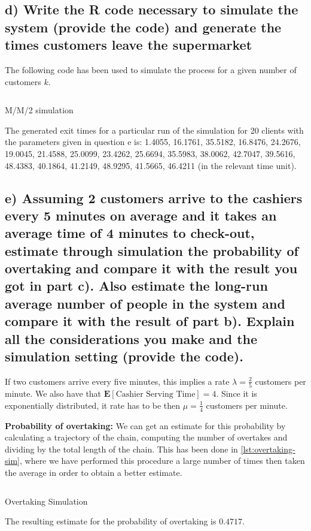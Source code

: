 \documentclass[11pt, a4paper]{article}
\begin{document}
\subsection*{d) Write the R code necessary to simulate the system (provide the code) and generate the times customers leave the supermarket}
The following code has been used to simulate the process for a given number of customers $k$.

\begin{listing}[H]
	\inputminted[firstline = 148, lastline = 173]{R}{../main.R}
	\caption{M/M/2 simulation}
	\label{lst:mm2sim}
\end{listing}
The generated exit times for a particular run of the simulation for 20 clients with the parameters given in question e is:  1.4055, 16.1761, 35.5182, 16.8476, 24.2676, 19.0045, 21.4588, 25.0099, 23.4262, 25.6694, 35.5983, 38.0062, 42.7047,
39.5616, 48.4383, 40.1864, 41.2149, 48.9295, 41.5665, 46.4211 (in the relevant time unit).

\subsection*{e) Assuming 2 customers arrive to the cashiers every 5 minutes on average and it takes an average time of 4 minutes to check-out, estimate through simulation the probability of overtaking and compare it with the result you got in part c). Also estimate the long-run average number of people in the system and compare it with the result of part b). Explain all the considerations you make and the simulation setting (provide the code).}
If two customers arrive every five minutes, this implies a rate $\lambda = \frac{2}{5}$ customers per minute. We also have that $\mathbf{E}\left[ \text{Cashier Serving Time}\right] = 4$. Since it is exponentially distributed, it rate has to be then $\mu = \frac{1}{4}$ customers per minute.


\textbf{Probability of overtaking:} We can get an estimate for this probability by calculating a trajectory of the chain, computing the number of overtakes and dividing by the total length of the chain. This has been done in \cref{lst:overtaking-sim}, where we have performed this procedure a large number of times then taken the average in order to obtain a better estimate.
\begin{listing}[H]
	\inputminted[firstline = 180, lastline = 192]{R}{../main.R}
	\caption{Overtaking Simulation}
	\label{lst:overtaking-sim}
\end{listing}
The resulting estimate for the probability of overtaking is $0.4717$.
\end{document}
